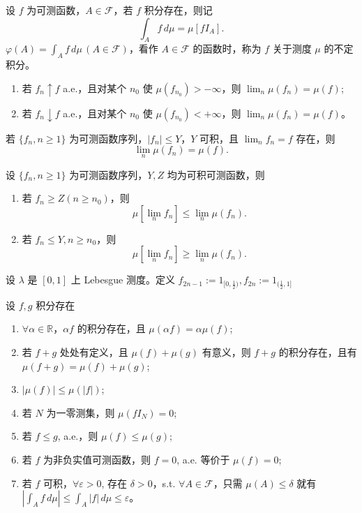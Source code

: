 \documentclass[lang=cn,10pt,thmcnt=section]{elegantbook}
\begin{document}
\begin{theorem}
	设 \(f\) 为可测函数，\(A \in \mathscr{F}\)，若 \(f\) 积分存在，则记
\[
\int_A f \, d\mu = \mu[f I_A].
\]
\(\varphi(A) = \int_A f \, d\mu \, (A \in \mathscr{F})\)，看作 \(A \in \mathscr{F}\) 的函数时，称为 \(f\) 关于测度 \(\mu\) 的不定积分。
\end{theorem}
\begin{theorem}[单调收敛定理]
	\begin{enumerate}
		\item 若 \(f_n \uparrow f\) a.e.，且对某个 \(n_0\) 使 \(\mu(f_{n_0}) > -\infty\)，则 \(\lim_n \mu(f_n) = \mu(f)\);
		\item 若 \(f_n \downarrow f\) a.e.，且对某个 \(n_0\) 使 \(\mu(f_{n_0}) < +\infty\)，则 \(\lim_n \mu(f_n) = \mu(f)\)。
	\end{enumerate}
\end{theorem}
\begin{theorem}
	若 \(\{f_n, n \geq 1\}\) 为可测函数序列，\(|f_n| \leq Y\)，\(Y\) 可积，且 \(\lim_n f_n = f\) 存在，则
\[
\lim_n \mu(f_n) = \mu(f).
\]
\end{theorem}
\begin{theorem}[Fatou 引理]
	设 \(\{f_n, n \geq 1\}\) 为可测函数序列，\(Y, Z\) 均为可积可测函数，则
\begin{enumerate}
    \item 若 \(f_n \geq Z (n \geq n_0)\)，则
    \[
    \mu\left[\lim_n f_n\right] \leq \lim_n \mu(f_n). \tag{1.2.2}
    \]
    \item 若 \(f_n \leq Y, n \geq n_0\)，则
    \[
    \mu\left[\lim_n f_n\right] \geq \lim_n \mu(f_n). \tag{1.2.3}
    \]
\end{enumerate}

设 \(\lambda\) 是 \([0, 1]\) 上 Lebesgue 测度。定义 \(f_{2n-1} := 1_{[0, \frac{1}{2})}, f_{2n} := 1_{(\frac{1}{2}, 1]}\)
\end{theorem}
\begin{theorem}
	设 \(f, g\) 积分存在
\begin{enumerate}
    \item \(\forall \alpha \in \mathbb{R}\)，\(\alpha f\) 的积分存在，且 \(\mu(\alpha f) = \alpha \mu(f)\);
    \item 若 \(f + g\) 处处有定义，且 \(\mu(f) + \mu(g)\) 有意义，则 \(f + g\) 的积分存在，且有 \(\mu(f + g) = \mu(f) + \mu(g)\);
    \item \(|\mu(f)| \leq \mu(|f|)\);
    \item 若 \(N\) 为一零测集，则 \(\mu(f I_N) = 0\);
    \item 若 \(f \leq g\), a.e.，则 \(\mu(f) \leq \mu(g)\);
    \item 若 \(f\) 为非负实值可测函数，则 \(f = 0\), a.e. 等价于 \(\mu(f) = 0\);
    \item 若 \(f\) 可积，\(\forall \varepsilon > 0\), 存在 \(\delta > 0\)，s.t. \(\forall A \in \mathcal{F}\)，只需 \(\mu(A) \leq \delta\) 就有 \(|\int_A f \, d\mu| \leq \int_A |f| \, d\mu \leq \varepsilon\)。
\end{enumerate}
\end{theorem}
\end{document}
